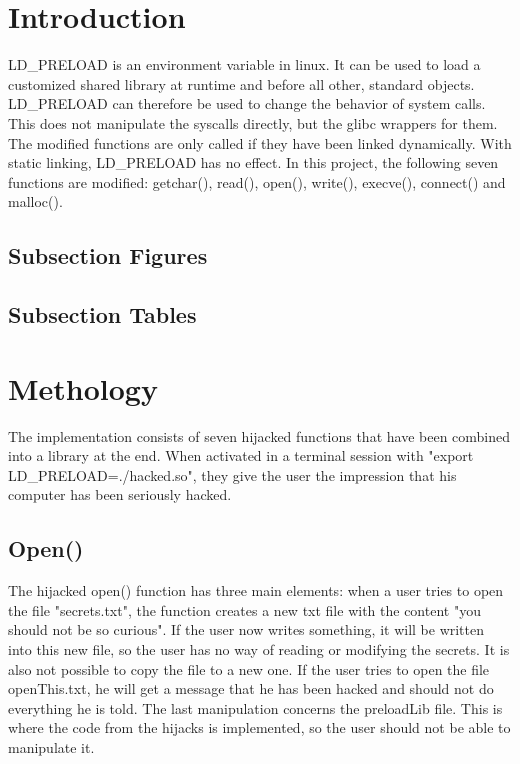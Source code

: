 \section{Introduction}\label{sec:intro}
LD\_PRELOAD is an environment variable in linux. 
It can be used to load a customized shared library at runtime and before all other, standard objects.
LD\_PRELOAD can therefore be used to change the behavior of system calls. 
This does not manipulate the syscalls directly, but the glibc wrappers for them. 
The modified functions are only called if they have been linked dynamically. With static linking, LD\_PRELOAD has no effect. 
In this project, the following seven functions are modified: getchar(), read(), open(), write(), execve(), connect() and malloc().

\subsection{Subsection Figures} %


\subsection{Subsection Tables}

\section{Methology}
The implementation consists of seven hijacked functions that have been combined into a library at the end.
When activated in a terminal session with "export LD\_PRELOAD=./hacked.so", they give the user the impression that his computer has been seriously hacked.

\subsection{Open()}
The hijacked open() function has three main elements:
 when a user tries to open the file "secrets.txt", the function creates a new txt file with the content "you should not be so curious".
If the user now writes something, it will be written into this new file, so the user has no way of reading or modifying the secrets. 
It is also not possible to copy the file to a new one. If the user tries to open the file openThis.txt, he will get a message that he has been hacked and should not do everything he is told. 
The last manipulation concerns the preloadLib file. This is where the code from the hijacks is implemented, so the user should not be able to manipulate it.

